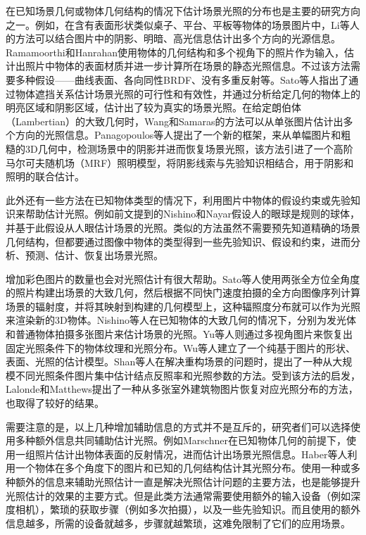 在已知场景几何或物体几何结构的情况下估计场景光照的分布也是主要的研究方向之一。例如，在含有表面形状类似桌子、平台、平板等物体的场景图片中，Li等人\cite{li2003multiple}的方法可以结合图片中的阴影、明暗、高光信息估计出多个方向的光源信息。Ramamoorthi和Hanrahan\cite{ramamoorthi2001signal}使用物体的几何结构和多个视角下的照片作为输入，估计出照片中物体的表面材质并进一步计算所在场景的静态光照信息。不过该方法需要多种假设——曲线表面、各向同性BRDF、没有多重反射等。Sato等人\cite{sato2003illumination}指出了通过物体遮挡关系估计场景光照的可行性和有效性，并通过分析给定几何的物体上的明亮区域和阴影区域，估计出了较为真实的场景光照。在给定朗伯体（Lambertian）的大致几何时，Wang和Samaras\cite{wang2002estimation}的方法可以从单张图片估计出多个方向的光照信息。Panagopoulos等人\cite{panagopoulos2011illumination}提出了一个新的框架，来从单幅图片和粗糙的3D几何中，检测场景中的阴影并进而恢复场景光照，该方法引进了一个高阶马尔可夫随机场（MRF）照明模型，将阴影线索与先验知识相结合，用于阴影和照明的联合估计。

此外还有一些方法在已知物体类型的情况下，利用图片中物体的假设约束或先验知识来帮助估计光照。例如前文提到的Nishino和Nayar\cite{nishino2004eyes}假设人的眼球是规则的球体，并基于此假设从人眼估计场景的光照。类似的方法\cite{barron2015shape, lopez2010compositing}虽然不需要预先知道精确的场景几何结构，但都要通过图像中物体的类型得到一些先验知识、假设和约束，进而分析、预测、估计、恢复出场景光照。

增加彩色图片的数量也会对光照估计有很大帮助。Sato等人\cite{sato1999acquiring}使用两张全方位全角度的照片构建出场景的大致几何，然后根据不同快门速度拍摄的全方向图像序列计算场景的辐射度，并将其映射到构建的几何模型上，这种辐照度分布就可以作为光照来渲染新的3D物体。Nishino等人\cite{nishino2001determining, nishino2005re}在已知物体的大致几何的情况下，分别为发光体和普通物体拍摄多张图片来估计场景的光照。Yu等人\cite{yu2006sparse}则通过多视角图片来恢复出固定光照条件下的物体纹理和光照分布。Wu等人\cite{wu2011high}建立了一个纯基于图片的形状、表面、光照的估计模型。Shan等人\cite{shan2013visual}在解决重构场景的问题时，提出了一种从大规模不同光照条件图片集中估计结点反照率和光照参数的方法。受到该方法的启发，Lalonde和Matthews\cite{lalonde2014lighting}提出了一种从多张室外建筑物图片恢复对应光照分布的方法，也取得了较好的结果。

需要注意的是，以上几种增加辅助信息的方式并不是互斥的，研究者们可以选择使用多种额外信息共同辅助估计光照。例如Marschner\cite{marschner1997inverse}在已知物体几何的前提下，使用一组照片估计出物体表面的反射情况，进而估计出场景光照信息。Haber等人\cite{haber2009relighting}利用一个物体在多个角度下的图片和已知的几何结构估计其光照分布。使用一种或多种额外的信息来辅助光照估计一直是解决光照估计问题的主要方法，也是能够提升光照估计的效果的主要方式。但是此类方法通常需要使用额外的输入设备（例如深度相机），繁琐的获取步骤（例如多次拍摄），以及一些先验知识。而且使用的额外信息越多，所需的设备就越多，步骤就越繁琐，这难免限制了它们的应用场景。


